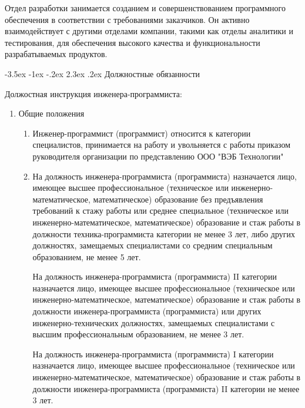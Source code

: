 \documentclass[a4paper,draft]{report}
\makeatletter
\renewcommand\section{\@startsection {section}{1}{\z@}%
  {-3.5ex \@plus -1ex \@minus -.2ex}%
  {2.3ex \@plus.2ex}%
  {\normalfont\newpage\indent\bfseries}}
\makeatother
\begin{document}
Отдел разработки занимается созданием и совершенствованием программного обеспечения в соответствии с требованиями заказчиков.
Он активно взаимодействует с другими отделами компании, такими как отделы аналитики и тестирования, для обеспечения высокого качества и функциональности разрабатываемых продуктов.

\section{Должностные обязанности}

Должостная инструкция инженера-программиста:
\begin{enumerate}
    \item Общие положения
          \begin{enumerate}
              \item Инженер-программист (программист) относится к категории специалистов, принимается на работу и увольняется с работы приказом руководителя организации по представлению ООО "ВЭБ Технологии"

              \item На должность инженера-программиста (программиста) назначается лицо, имеющее высшее профессиональное (техническое или инженерно-математическое, математическое) образование без предъявления требований к стажу работы или среднее специальное (техническое или инженерно-математическое, математическое) образование и стаж работы в должности техника-программиста категории не менее 3 лет, либо других должностях, замещаемых специалистами со средним специальным образованием, не менее 5 лет.

                    На должность инженера-программиста (программиста) II категории назначается лицо, имеющее высшее профессиональное (техническое или инженерно-математическое, математическое) образование и стаж работы в должности инженера-программиста (программиста) или других инженерно-технических должностях, замещаемых специалистами с высшим профессиональным образованием, не менее 3 лет.

                    На должность инженера-программиста (программиста) I категории назначается лицо, имеющее высшее профессиональное (техническое или инженерно-математическое, математическое) образование и стаж работы в должности инженера-программиста (программиста) II категории не менее 3 лет.


\end{enumerate}
\end{enumerate}
\end{document}
